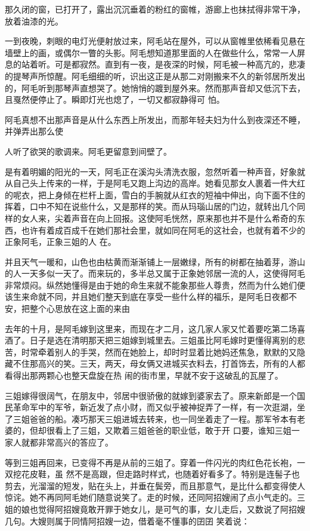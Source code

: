 \documentclass{article}
\begin{document}
那久闭的窗，已打开了，露出沉沉垂着的粉红的窗帷，游廊上也抹拭得非常干净，放着油漆的光。

一到夜晚，刺眼的电灯光便射放过来，阿毛站在屋外，可以从窗帷里依稀看见悬在墙壁上的画，或偶尔一瞥的头影。阿毛想知道那里面的人在做些什么，常常一人屏息的站着听。可是都寂然。直到有一夜，是夜深的时候，阿毛被一种高亢的，悲凄的提琴声所惊醒。阿毛细细的听，识出这正是从那二对刚搬来不久的新邻居所发出的，阿毛听到那琴声直想哭了。她悄悄的踱到屋外来。然而那声音却又低沉下去，且戛然便停止了。瞬即灯光也熄了，一切又都寂静得可
怕。 

阿毛真想不出那声音是从什么东西上所发出，而那年轻夫妇为什么到夜深还不睡，并弹弄出那么使
\newpage

人听了欲哭的歌调来。阿毛更留意到间壁了。 

是有着明媚的阳光的一天，阿毛正在溪沟头清洗衣服，忽然听着一种声音，好象就从自己头上传来的一样，于是阿毛又跑上沟边的高岸。她看见那女人裹着一件大红的呢衣，把上身倾在栏杆上面，雪白的手腕就从红衣的短袖中伸出，向下面不住的挥着，口中不知在说些什么，又是那样的笑。而从玛瑙山居的门边，就转出几个同样的女人来，尖着声音在向上回报。这使阿毛恍然，原来那也并不是什么希奇的东西，也许有着成百成千在她们那社会里，就如同在阿毛的这社会，也就有着不少的正象阿毛，正象三姐的人
在。 

并且天气一暖和，山色也由枯黄而渐渐铺上一层嫩绿，所有的树都在抽着芽，游山的人一天多似一天了。而来玩的，多半总又属于正象她邻居一流的人，这使得阿毛非常烦闷。纵然她懂得是由于她的命生来就不能象那些人尊贵，然而为什么她们便该生来命就不同，并且她们整天到底在享受一些什么样的福乐，是阿毛日夜都不安，把整个心思放在这上面的来由
\newpage



去年的十月，是阿毛嫁到这里来，而现在才二月，这几家人家又忙着要吃第二场喜酒了。日子是选在清明那天把三姐嫁到城里去。三姐虽比阿毛嫁时更懂得离别的悲苦，时常牵着别人的手哭，然而在她脸上，却时时显着比她妈还焦急，默默的又隐藏不住那高兴的笑。三天，两天，母女俩又进城买衣料去，打首饰去，所有的人都看得出那两颗心也整天盘旋在热
闹的街市里，早就不安于这破乱的瓦屋了。 

三姐嫁得很阔气，在朋友中，邻居中很骄傲的就嫁到婆家去了。原来新郎是一个国民革命军中的军爷，新近发了点小财，而又似乎被神捉弄了一样，有一次逛湖，坐了三姐爸爸的船。凑巧那天三姐进城去转来，也一同坐着走了一程。那军爷本有老婆的，但却很看上了三姐，又欺着三姐爸爸的职业低，敢于开
口要，谁知三姐一家人就都非常高兴的答应了。 

等到三姐再回来，已变得不再是从前的三姐了。穿着一件闪光的肉红色花长袍，一双挖花皮鞋，虽
\newpage
然不是高跟，但走路时样式，也随着好看多了。特别是连髻子也剪去，光溜溜的短发，贴在头上，并垂在鬓旁，而且那意气，是比什么都变得使人惊诧。她不再同阿毛她们随意说笑了。走的时候，还同阿招嫂闹了点小气走的。三姐的娘也觉得阿招嫂竟敢开罪于她女儿，是可气的事，女儿走后，又数说了阿招嫂几句。大嫂则属于同情阿招嫂一边，借着毫不懂事的囝囝
笑着说： 
\end{document}
